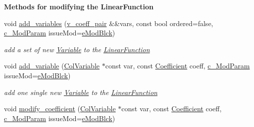 \begin{Indent}\textbf{ Methods for modifying the Linear\+Function}\par
\begin{DoxyCompactItemize}
\item 
void \mbox{\hyperlink{class_s_m_spp__di__unipi__it_1_1_linear_function_af5b5ea0e76a8726a602d6134dda294d0}{add\+\_\+variables}} (\mbox{\hyperlink{class_s_m_spp__di__unipi__it_1_1_linear_function_aee8988faa66c7c9013613e2c76580ddf}{v\+\_\+coeff\+\_\+pair}} \&\&vars, const bool ordered=false, \mbox{\hyperlink{group___modification___t_y_p_e_s_ga544246d8c462e9a2d817c2c30797968f}{c\+\_\+\+Mod\+Param}} issue\+Mod=\mbox{\hyperlink{group___modification___t_y_p_e_s_gga48fddcdd03a03f49b7e389ca1ed938d4a21b14b26b1c0093a0905f6fc010bad29}{e\+Mod\+Blck}})
\begin{DoxyCompactList}\small\item\em add a set of new \mbox{\hyperlink{class_s_m_spp__di__unipi__it_1_1_variable}{Variable}} to the \mbox{\hyperlink{class_s_m_spp__di__unipi__it_1_1_linear_function}{Linear\+Function}} \end{DoxyCompactList}\item 
void \mbox{\hyperlink{class_s_m_spp__di__unipi__it_1_1_linear_function_a72d0d03fc72f08b2b29e30c07743a742}{add\+\_\+variable}} (\mbox{\hyperlink{class_s_m_spp__di__unipi__it_1_1_col_variable}{Col\+Variable}} $\ast$const var, const \mbox{\hyperlink{class_s_m_spp__di__unipi__it_1_1_linear_function_a1fa0f848dbb8d52dc62a1adfee1a1f90}{Coefficient}} coeff, \mbox{\hyperlink{group___modification___t_y_p_e_s_ga544246d8c462e9a2d817c2c30797968f}{c\+\_\+\+Mod\+Param}} issue\+Mod=\mbox{\hyperlink{group___modification___t_y_p_e_s_gga48fddcdd03a03f49b7e389ca1ed938d4a21b14b26b1c0093a0905f6fc010bad29}{e\+Mod\+Blck}})
\begin{DoxyCompactList}\small\item\em add one single new \mbox{\hyperlink{class_s_m_spp__di__unipi__it_1_1_variable}{Variable}} to the \mbox{\hyperlink{class_s_m_spp__di__unipi__it_1_1_linear_function}{Linear\+Function}} \end{DoxyCompactList}\item 
void \mbox{\hyperlink{class_s_m_spp__di__unipi__it_1_1_linear_function_a1f782a91f250a2724392acbe48c3a66c}{modify\+\_\+coefficient}} (\mbox{\hyperlink{class_s_m_spp__di__unipi__it_1_1_col_variable}{Col\+Variable}} $\ast$const var, const \mbox{\hyperlink{class_s_m_spp__di__unipi__it_1_1_linear_function_a1fa0f848dbb8d52dc62a1adfee1a1f90}{Coefficient}} coeff, \mbox{\hyperlink{group___modification___t_y_p_e_s_ga544246d8c462e9a2d817c2c30797968f}{c\+\_\+\+Mod\+Param}} issue\+Mod=\mbox{\hyperlink{group___modification___t_y_p_e_s_gga48fddcdd03a03f49b7e389ca1ed938d4a21b14b26b1c0093a0905f6fc010bad29}{e\+Mod\+Blck}})

\end{DoxyCompactItemize}
\end{Indent}
